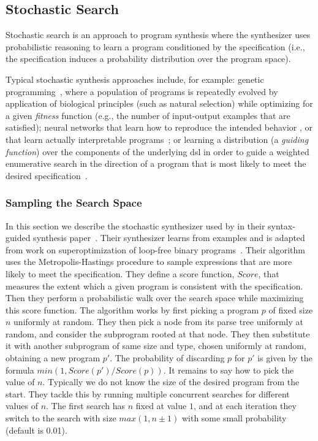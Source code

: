 \subsection{Stochastic Search}
\label{sec:stochastic-search}

Stochastic search is an approach to program synthesis where the synthesizer uses
probabilistic reasoning to learn a program conditioned by the specification
(i.e., the specification induces a probability distribution over the program
space).

Typical stochastic synthesis approaches include, for example:
genetic programming~\cite{Weimer:2009:AFP}, where a population of programs is
repeatedly evolved by application of biological principles (such as natural
selection) while optimizing for a given \textit{fitness} function (e.g., the
number of input-output examples that are satisfied);
neural networks that learn how to reproduce the intended
behavior%
, or that learn actually interpretable
programs~\cite{Parisotto:2016:NPS}; or
learning a distribution (a \textit{guiding function}) over the components of
the underlying \gls{dsl} in order to guide a weighted enumerative search in the
direction of a program that is most likely to meet the desired
specification~\cite{Lee:ASP:2018,Balog:2017:DC}. %

\subsubsection{Sampling the Search Space}
\label{sec:sampling}

In this section we describe the stochastic synthesizer used by
\citeauthor{Alur:sygus:2013} in their syntax-guided synthesis
paper~\cite{Alur:sygus:2013}.
Their synthesizer learns from examples and is adapted from work on
superoptimization of loop-free binary programs~\cite{Schkufza:2013:SS}.
Their algorithm uses the Metropolis-Hastings procedure to sample expressions
that are more likely to meet the specification.
They define a score function, $Score$, that measures the extent which a given
program is consistent with the specification.
Then they perform a probabilistic walk over the search space while maximizing
this score function.
The algorithm works by first picking a program $p$ of fixed size $n$ uniformly
at random.
They then pick a node from its parse tree uniformly at random, and consider the
subprogram rooted at that node.
They then substitute it with another subprogram of same size and type, chosen
uniformly at random, obtaining a new program $p'$.
The probability of discarding $p$ for $p'$ is given by the formula $min(1,
Score(p')/Score(p))$.
It remains to say how to pick the value of $n$.
Typically we do not know the size of the desired program from the start.
They tackle this by running multiple concurrent searches for different values of
$n$.
The first search has $n$ fixed at value $1$, and at each iteration they switch
to the search with size $max(1, n\pm{}1)$ with some small probability (default
is 0.01).
